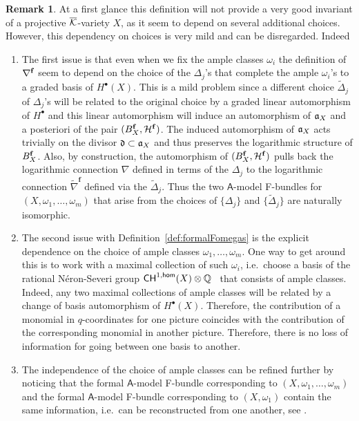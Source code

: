 \documentclass[twoside,leqno]{article}
\numberwithin{equation}{section}
\theoremstyle{plain}
\theoremstyle{definition}
\newtheorem{remark}[equation]{Remark}
\begin{document}
\begin{remark} \label{rem:ambiguities}
At a first glance this definition will not provide a very good invariant of a  projective $\overline{\mathcal K}$-variety $X$,  as it seem to depend on several additional choices. However, this dependency on choices is very mild and can be disregarded. Indeed
\begin{enumerate}[wide]
\item[(a)] The first issue is that even when we fix the ample classes $\omega_{i}$  the definition of $\nabla^{\mathbf{f}}$ seem to depend on the choice of the $\Delta_{j}$'s that complete the ample $\omega_{i}$'s to a graded basis of $H^{\bullet}(X)$.  This is a mild problem since a different choice $\widetilde{\Delta}_{j}$ of $\Delta_{j}$'s will be related to the original choice by a graded linear automorphism of $H^{\bullet}$ and this linear automorphism will induce an automorphism of ${\mathfrak{a}}_{X}$ and a posteriori of the pair $(B_{X}^{\mathbf{f}},\mathcal H^{\mathbf{f}})$. The induced  automorphism of ${\mathfrak{a}}_{X}$ acts trivially on the divisor $\mathfrak{d} \subset {\mathfrak{a}}_{X}$ and thus preserves the logarithmic structure of $B_{X}^{\mathbf{f}}$. Also, by construction, the automorphism of $(B_{X}^{\mathbf{f}},\mathcal H^{\mathbf{f}})$  pulls back the logarithmic connection $\nabla$ defined in terms of the $\Delta_{j}$ to the logarithmic connection $\widetilde{\nabla}^{\mathbf{f}}$ defined via the  $\widetilde{\Delta}_{j}$. Thus the two $\mathsf{A}$-model F-bundles for 
$(X,\omega_{1}, \ldots, \omega_{m})$ that arise from the choices of $\{\Delta_{j}\}$ and 
$\{\widetilde{\Delta}_{j}\}$ are naturally isomorphic. 
\item[(b)] The second issue with Definition~\ref{def:formalFomegas} is the explicit dependence on the choice of ample classes 
$\omega_{1}, \ldots, \omega_{m}$. One way to get around this is to work with a maximal collection of such $\omega_{i}$, i.e.\ choose a basis of the rational N\'{e}ron-Severi group $\mathsf{CH}^{1,\mathsf{hom}}(X)\otimes \mathbb Q$ \ that consists of ample classes. Indeed, any two  maximal collections of ample classes will be related by a change of basis automorphism of $H^{\bullet}(X)$. Therefore, the contribution of a monomial in $q$-coordinates for one picture coincides with the contribution of the corresponding monomial in another picture. Therefore, there is no loss of information for going between one basis to another.  %
\item[(c)] The independence of the choice of ample  classes can be refined further by noticing that 
the formal $\mathsf{A}$-model F-bundle corresponding to $(X,\omega_{1},\ldots,\omega_{m})$ and the formal $\mathsf{A}$-model F-bundle corresponding to $(X,\omega_{1})$ contain the same information, i.e.\ can be reconstructed from one another, see \cite[Lemma~2.24]{HYZZ_Decomposition}.
\end{enumerate}
\end{remark}
\end{document}
